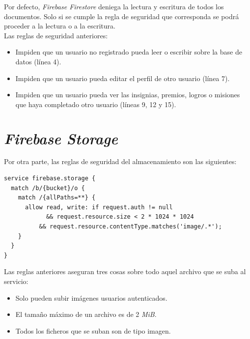 \documentclass[twoside]{report}
\begin{document}
Por defecto, \textit{Firebase Firestore} deniega la lectura y escritura de todos los documentos. Solo si se cumple la regla de seguridad que corresponda se podrá proceder a la lectura o a la escritura. \\

Las reglas de seguridad anteriores:
\begin{itemize}
\item Impiden que un usuario no registrado pueda leer o escribir sobre la base de datos (línea 4).
\item Impiden que un usuario pueda editar el perfil de otro usuario (línea 7).
\item Impiden que un usuario pueda ver las insignias, premios, logros o misiones que haya completado otro usuario (líneas 9, 12 y 15).
\end{itemize}

\clearpage

\section*{\textit{Firebase Storage}}

Por otra parte, las reglas de seguridad del almacenamiento son las siguientes:

\begin{lstlisting}
service firebase.storage {
  match /b/{bucket}/o {
    match /{allPaths=**} {
      allow read, write: if request.auth != null 
      		&& request.resource.size < 2 * 1024 * 1024
          && request.resource.contentType.matches('image/.*');
    }
  }
}
\end{lstlisting}

Las reglas anteriores aseguran tres cosas sobre todo aquel archivo que se suba al servicio:
\begin{itemize}
\item Solo pueden subir imágenes usuarios autenticados.
\item El tamaño máximo de un archivo es de 2 \textit{MiB}.
\item Todos los ficheros que se suban son de tipo imagen.
\end{itemize}
\end{document}

